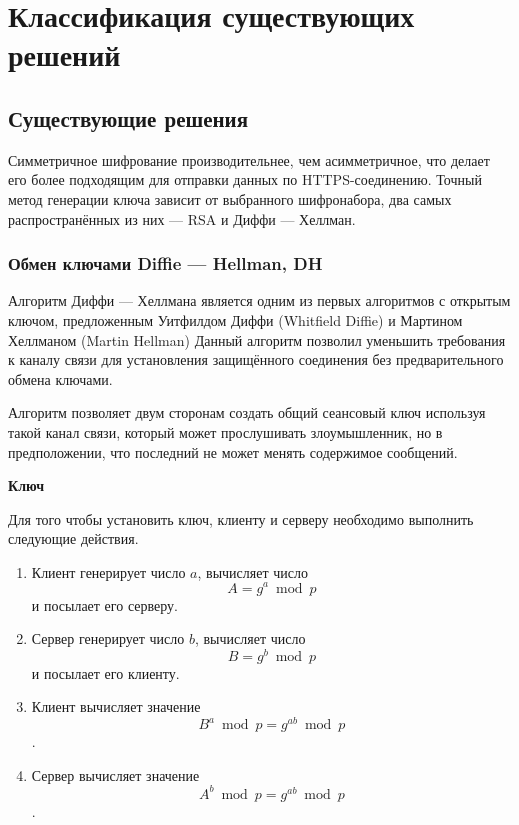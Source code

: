 \chapter{Классификация существующих решений}

    \section{Существующие решения}
    
    Симметричное шифрование производительнее, чем асимметричное, что делает его более подходящим для отправки данных по HTTPS-соединению. Точный метод генерации ключа зависит от выбранного шифронабора, два самых распространённых из них — RSA и Диффи --- Хеллман.
    

    
   	\subsection{Обмен ключами Diffie --- Hellman, DH}
   	
   	Алгоритм Диффи --- Хеллмана является одним из первых алгоритмов с открытым ключом, предложенным Уитфилдом Диффи (Whitfield Diffie) и Мартином Хеллманом (Martin Hellman) \cite{DH}
   	Данный алгоритм позволил уменьшить требования к каналу связи для установления защищённого соединения без предварительного обмена ключами.
   	
   	
   	Алгоритм позволяет двум сторонам создать общий сеансовый ключ используя такой канал связи, который может прослушивать злоумышленник, но в предположении, что последний не может менять содержимое сообщений.
   	
   	\textbf{Ключ}
   	
   	Для того чтобы установить ключ, клиенту и серверу необходимо выполнить следующие действия.
   	
   	\begin{enumerate}
   		\item Клиент генерирует число \(a\), вычисляет число
   		\begin{equation}
   			A = g^a \bmod p 
   			\label{eq1:ref}
   		\end{equation} 
   		и посылает его серверу.
   		\item Сервер генерирует число \(b\), вычисляет число 
   		\begin{equation}
   			B = g^b \bmod p 
   			\label{eq2:ref}
   		\end{equation}
   		и посылает его клиенту.
   		\item Клиент вычисляет значение
   		\begin{equation}
   			B^a \bmod p = g^{ab} \bmod p 
   			\label{eq3:ref}
   		\end{equation}.
   		\item Сервер вычисляет значение
   		\begin{equation}
   			A^b \bmod p = g^{ab} \bmod p 
   			\label{eq4:ref}
   		\end{equation}.
   	\end{enumerate}
   
